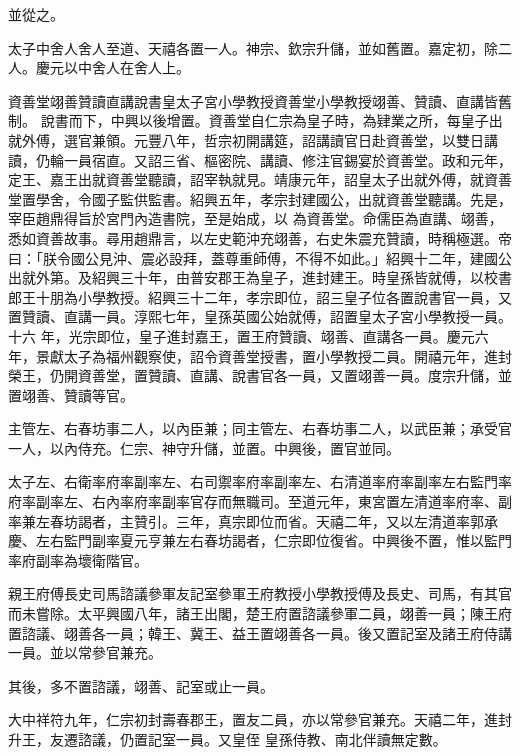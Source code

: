 \begin{pinyinscope}
 並從之。



 太子中舍人舍人至道、天禧各置一人。神宗、欽宗升儲，並如舊置。嘉定初，除二人。慶元以中舍人在舍人上。



 資善堂翊善贊讀直講說書皇太子宮小學教授資善堂小學教授翊善、贊讀、直講皆舊制。
 說書而下，中興以後增置。資善堂自仁宗為皇子時，為肄業之所，每皇子出就外傅，選官兼領。元豐八年，哲宗初開講筵，詔講讀官日赴資善堂，以雙日講讀，仍輪一員宿直。又詔三省、樞密院、講讀、修注官錫宴於資善堂。政和元年，定王、嘉王出就資善堂聽讀，詔宰執就見。靖康元年，詔皇太子出就外傅，就資善堂置學舍，令國子監供監書。紹興五年，孝宗封建國公，出就資善堂聽講。先是，宰臣趙鼎得旨於宮門內造書院，至是始成，以
 為資善堂。命儒臣為直講、翊善，悉如資善故事。尋用趙鼎言，以左史範沖充翊善，右史朱震充贊讀，時稱極選。帝曰：「朕令國公見沖、震必設拜，蓋尊重師傅，不得不如此。」紹興十二年，建國公出就外第。及紹興三十年，由普安郡王為皇子，進封建王。時皇孫皆就傅，以校書郎王十朋為小學教授。紹興三十二年，孝宗即位，詔三皇子位各置說書官一員，又置贊讀、直講一員。淳熙七年，皇孫英國公始就傅，詔置皇太子宮小學教授一員。十六
 年，光宗即位，皇子進封嘉王，置王府贊讀、翊善、直講各一員。慶元六年，景獻太子為福州觀察使，詔令資善堂授書，置小學教授二員。開禧元年，進封榮王，仍開資善堂，置贊讀、直講、說書官各一員，又置翊善一員。度宗升儲，並置翊善、贊讀等官。



 主管左、右春坊事二人，以內臣兼；同主管左、右春坊事二人，以武臣兼；承受官一人，以內侍充。仁宗、神守升儲，並置。中興後，置官並同。



 太子左、右衛率府率副率左、右司禦率府率副率左、右清道率府率副率左右監門率府率副率左、右內率府率副率官存而無職司。至道元年，東宮置左清道率府率、副率兼左春坊謁者，主贊引。三年，真宗即位而省。天禧二年，又以左清道率郭承慶、左右監門副率夏元亨兼左右春坊謁者，仁宗即位復省。中興後不置，惟以監門率府副率為壞衛階官。



 親王府傅長史司馬諮議參軍友記室參軍王府教授小學教授傅及長史、司馬，有其官而未嘗除。太平興國八年，諸王出閣，楚王府置諮議參軍二員，翊善一員；陳王府置諮議、翊善各一員；韓王、冀王、益王置翊善各一員。後又置記室及諸王府侍講一員。並以常參官兼充。



 其後，多不置諮議，翊善、記室或止一員。



 大中祥符九年，仁宗初封壽春郡王，置友二員，亦以常參官兼充。天禧二年，進封升王，友遷諮議，仍置記室一員。又皇侄
 皇孫侍教、南北伴讀無定數。




\end{pinyinscope}
